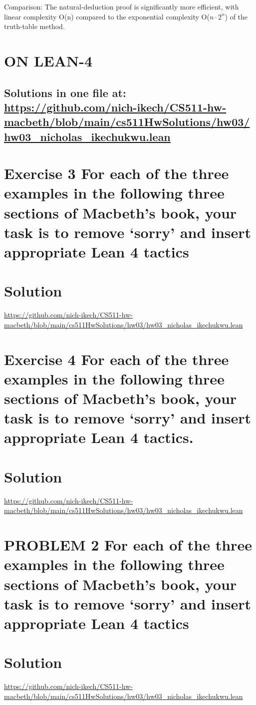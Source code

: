 \documentclass{article}
\begin{document}
Comparison: The natural-deduction proof is significantly more efficient, with linear complexity O(n) compared to the exponential complexity O($n \cdot 2^n$) of the truth-table method.



\newpage
\section*{ON LEAN-4}
\subsection*{Solutions in one file at: 
\url{https://github.com/nich-ikech/CS511-hw-macbeth/blob/main/cs511HwSolutions/hw03/hw03_nicholas_ikechukwu.lean}}

\newpage

\section*{Exercise 3 For each of the three examples in the following three sections of Macbeth’s book, your
task is to remove ‘sorry’ and insert appropriate Lean 4 tactics}
\section*{Solution}
\url{https://github.com/nich-ikech/CS511-hw-macbeth/blob/main/cs511HwSolutions/hw03/hw03_nicholas_ikechukwu.lean}

\newpage

\section*{Exercise 4 For each of the three examples in the following three sections of Macbeth’s book, your
task is to remove ‘sorry’ and insert appropriate Lean 4 tactics.}
\section*{Solution}

\url{https://github.com/nich-ikech/CS511-hw-macbeth/blob/main/cs511HwSolutions/hw03/hw03_nicholas_ikechukwu.lean}

\newpage

\section*{PROBLEM 2 For each of the three examples in the following three sections of Macbeth’s book,
your task is to remove ‘sorry’ and insert appropriate Lean 4 tactics}
\section*{Solution}

\url{https://github.com/nich-ikech/CS511-hw-macbeth/blob/main/cs511HwSolutions/hw03/hw03_nicholas_ikechukwu.lean}
\end{document}
